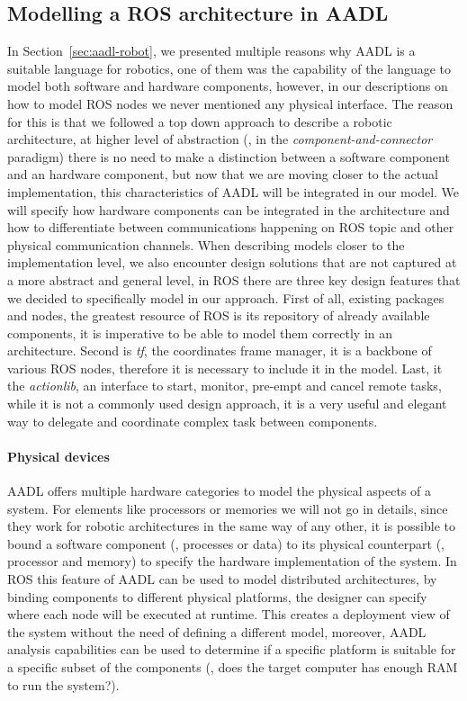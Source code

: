 \subsection{Modelling a ROS architecture in AADL}
\label{sec:ros-arch}
In Section~\ref{sec:aadl-robot}, we presented multiple reasons why AADL is a suitable language for robotics, one of them was the capability of the language to model both software and hardware components, however, in our descriptions on how to model ROS nodes we never mentioned any physical interface. The reason for this is that we followed a top down approach to describe a robotic architecture, at higher level of abstraction (\ie, in the \textit{component-and-connector} paradigm) there is no need to make a distinction between a software component and an hardware component, but now that we are moving closer to the actual implementation, this characteristics of AADL will be integrated in our model. We will specify how hardware components can be integrated in the architecture and how to differentiate between communications happening on ROS topic and other physical communication channels. When describing models closer to the implementation level, we also encounter design solutions that are not captured at a more abstract and general level, in ROS there are three key design features that we decided to specifically model in our approach. First of all, existing packages and nodes, the greatest resource of ROS is its repository of already available components, it is imperative to be able to model them correctly in an architecture. Second is \textit{tf}, the coordinates frame manager, it is a backbone of various ROS nodes, therefore it is necessary to include it in the model. Last, it the \textit{actionlib}, an interface to start, monitor, pre-empt and cancel remote tasks, while it is not a commonly used design approach, it is a very useful and elegant way to delegate and coordinate complex task between components.

\paragraph{Physical devices} AADL offers multiple hardware categories to model the physical aspects of a system. For elements like processors or memories we will not go in details, since they work for robotic architectures in the same way of any other, it is possible to bound a software component (\eg, processes or data) to its physical counterpart (\eg, processor and memory) to specify the hardware implementation of the system. In ROS this feature of AADL can be used to model distributed architectures, by binding components to different physical platforms, the designer can specify where each node will be executed at runtime. This creates a deployment view of the system without the need of defining a different model, moreover, AADL analysis capabilities can be used to determine if a specific platform is suitable for a specific subset of the components (\eg, does the target computer has enough RAM to run the system?).

